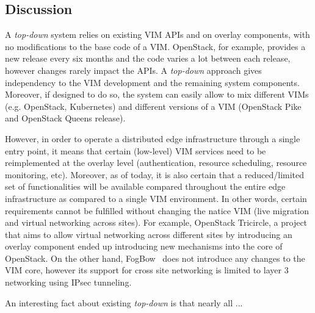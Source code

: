 


\subsection{Discussion}
\label{sec:design_discussion}


A \emph{top-down} system  relies on existing VIM APIs and on overlay components, with no modifications to the base code of a VIM.
OpenStack, for example, provides a new release every six months and the code varies a lot between each release, however changes rarely impact the APIs. A \emph{top-down} approach gives independency to the VIM development and the remaining system components. Moreover, if designed to do so, the system can easily allow to mix different VIMs (e.g. OpenStack, Kubernetes) and different versions of a VIM (\eg OpenStack Pike and OpenStack Queens release). 

However, in order to operate a distributed edge infrastructure through a single entry point, it means that certain (low-level) VIM services need to be reimplemented at the overlay level (\eg authentication, resource scheduling, resource monitoring, etc). 
Moreover, as of today, it is also certain that a reduced/limited set of functionalities will be available compared throughout the entire edge infrastructure as compared to a single VIM environment. In other words, certain requirements cannot be fulfilled without changing the natice VIM (\eg live migration and virtual networking across sites). For example, OpenStack Tricircle, a project that aims to allow virtual networking across different sites by introducing an overlay component ended up introducing new mechanisms into the core of OpenStack. On the other hand, FogBow~\cite{brasileiro2016fogbow} does not introduce any changes to the VIM core, however its support for cross site networking is limited to layer 3 networking using IPsec tunneling.

An interesting fact about existing \emph{top-down} is that nearly all ...




